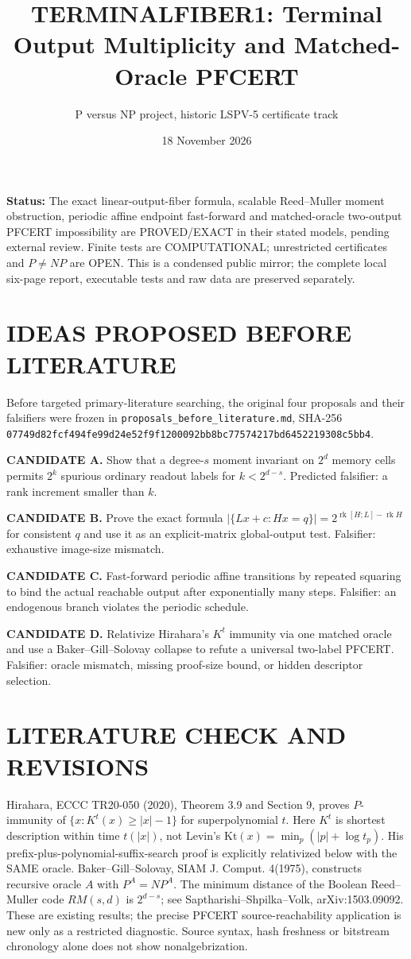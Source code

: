 \documentclass[11pt]{article}
\title{TERMINALFIBER1: Terminal Output Multiplicity and Matched-Oracle PFCERT}
\author{P versus NP project, historic LSPV-5 certificate track}
\date{18 November 2026}
\begin{document}
\maketitle
\noindent\textbf{Status:} The exact linear-output-fiber formula, scalable Reed--Muller moment obstruction, periodic affine endpoint fast-forward and matched-oracle two-output PFCERT impossibility are PROVED/EXACT in their stated models, pending external review. Finite tests are COMPUTATIONAL; unrestricted certificates and $P\ne NP$ are OPEN. This is a condensed public mirror; the complete local six-page report, executable tests and raw data are preserved separately.

\section{IDEAS PROPOSED BEFORE LITERATURE}
Before targeted primary-literature searching, the original four proposals and their falsifiers were frozen in \texttt{proposals\_before\_literature.md}, SHA-256 \texttt{07749d82fcf494fe99d24e52f9f1200092bb8bc77574217bd6452219308c5bb4}.

\noindent\textbf{CANDIDATE A.} Show that a degree-$s$ moment invariant on $2^d$ memory cells permits $2^k$ spurious ordinary readout labels for $k<2^{d-s}$. Predicted falsifier: a rank increment smaller than $k$.
\par\noindent\textbf{CANDIDATE B.} Prove the exact formula $|\{Lx+c:Hx=q\}|=2^{\operatorname{rk}[H;L]-\operatorname{rk}H}$ for consistent $q$ and use it as an explicit-matrix global-output test. Falsifier: exhaustive image-size mismatch.
\par\noindent\textbf{CANDIDATE C.} Fast-forward periodic affine transitions by repeated squaring to bind the actual reachable output after exponentially many steps. Falsifier: an endogenous branch violates the periodic schedule.
\par\noindent\textbf{CANDIDATE D.} Relativize Hirahara's $K^t$ immunity via one matched oracle and use a Baker--Gill--Solovay collapse to refute a universal two-label PFCERT. Falsifier: oracle mismatch, missing proof-size bound, or hidden descriptor selection.

\section{LITERATURE CHECK AND REVISIONS}
Hirahara, ECCC TR20-050 (2020), Theorem 3.9 and Section 9, proves $P$-immunity of $\{x:K^t(x)\ge |x|-1\}$ for superpolynomial $t$. Here $K^t$ is shortest description within time $t(|x|)$, not Levin's $\mathrm{Kt}(x)=\min_p(|p|+\log t_p)$. His prefix-plus-polynomial-suffix-search proof is explicitly relativized below with the SAME oracle. Baker--Gill--Solovay, SIAM J. Comput. 4(1975), constructs recursive oracle $A$ with $P^A=NP^A$. The minimum distance of the Boolean Reed--Muller code $RM(s,d)$ is $2^{d-s}$; see Saptharishi--Shpilka--Volk, arXiv:1503.09092. These are existing results; the precise PFCERT source-reachability application is new only as a restricted diagnostic. Source syntax, hash freshness or bitstream chronology alone does not show nonalgebrization.
\end{document}
